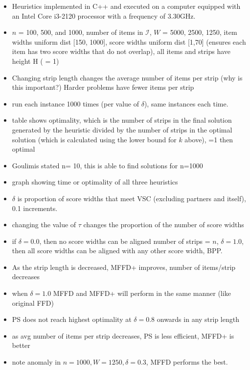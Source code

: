 \documentclass[oribibl]{llncs}
\begin{document}
\begin{itemize}
	\item Heuristics implemented in C++ and executed on a computer equipped with an Intel Core i3-2120 processor with a frequency of 3.30GHz.
	\item $n$ = 100, 500, and 1000, number of items in $\mathcal{I}$, $W$ = 5000, 2500, 1250, item widths uniform dist [150, 1000], score widths uniform dist [1,70] (ensures each item has two score widths that do not overlap), all items and strips have height H ( = 1)
	\item Changing strip length changes the average number of items per strip (why is this important?) Harder problems have fewer items per strip
	\item run each instance 1000 times (per value of $\delta$), same instances each time.
	\item table shows optimality, which is the number of strips in the final solution generated by the heuristic divided by the number of strips in the optimal solution (which is calculated using the lower bound for $k$ above), =1 then optimal
	\item Goulimis stated n= 10, this is able to find solutions for n=1000
	\item graph showing time or optimality of all three heuristics
	\item $\delta$ is proportion of score widths that meet VSC (excluding partners and itself), 0.1 increments.
	\item changing the value of $\tau$ changes the proportion of the number of score widths
	\item if $\delta = 0.0$, then no score widths can be aligned number of strips = $n$, $\delta = 1.0$, then all score widths can be aligned with any other score width, BPP.
	\item As the strip length is decreased, MFFD+ improves, number of items/strip decreases
	\item when $\delta = 1.0$ MFFD and MFFD+ will perform in the same manner (like original FFD)
	\item PS does not reach highest optimality at $\delta = 0.8$ onwards in any strip length
	\item as avg number of items per strip decreases, PS is less efficient, MFFD+ is better
	\item note anomaly in $n = 1000, W = 1250, \delta = 0.3$, MFFD performs the best.
\end{itemize}
\end{document}
